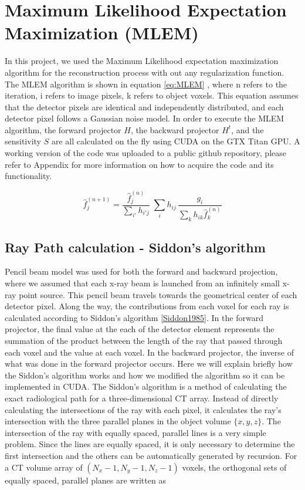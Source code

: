 \section{Maximum Likelihood Expectation Maximization (MLEM) }
In this project, we used the Maximum Likelihood expectation maximization algorithm for the reconstruction process with out any regularization function.  The MLEM algorithm is shown in equation \ref{eq:MLEM} \citep{EmissionTom2004}, where n refers to the iteration, i refers to image pixels, k refers to object voxels.  This equation assumes that the detector pixels are identical and independently distributed, and each detector pixel follows a Gaussian noise model.  In order to execute the MLEM algorithm, the forward projector $H$, the backward projector $H^t$, and the sensitivity $S$ are all calculated on the fly using CUDA on the GTX Titan GPU.  A working version of the code was uploaded to a public github repository, please refer to Appendix for more information on how to acquire the code and its functionality.

\begin{equation}
\hat{f}^{(n+1)}_{j} = \frac{\hat{f}^{(n)}_j}{{\sum\limits_{i'}} h_{i'j}} \; 
						\sum\limits_{i} h_{ij} \, \frac{g_{i}}{\sum\limits_{k} h_{ik} \hat{f}_{k}^{(n)}}
\label{eq:MLEM}
\end{equation}

\begin{figure}[ht]
\centering
{}
\label{fig:forwardmodel}
\end{figure}

\subsection{Ray Path calculation - Siddon's algorithm}
Pencil beam model was used for both the forward and backward projection, where we assumed that each x-ray beam is launched from an infinitely small x-ray point source. This pencil beam travels towards the geometrical center of each detector pixel.  Along the way, the contributions from each voxel for each ray is calculated according to Siddon's algorithm \ref{Siddon1985}.  In the forward projector, the final value at the each of the detector element represents the summation of the product between the length of the ray that passed through each voxel and the value at each voxel.  In the backward projector, the inverse of what was done in the forward projector occurs. 
Here we will explain briefly how the Siddon's algorithm works and how we modified the algorithm so it can be implemented in CUDA. 
The Siddon's algorithm is a method of calculating the exact radiological path for a three-dimensional CT array.  Instead of directly calculating the intersections of the ray with each pixel, it calculates the ray's intersection with the three parallel planes in the object volume $\{ x, y, z \}$.  The intersection of the ray with equally spaced, parallel lines is a very simple problem.  Since the lines are equally spaced, it is only necessary to determine the first intersection and the others can be automatically generated by recursion.  For a CT volume array of $(N_x -1, N_y-1, N_z-1)$ voxels, the orthogonal sets of equally spaced, parallel planes are written as

